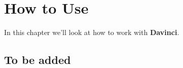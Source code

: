 \chapter{How to Use}

In this chapter we'll look at how to work with \textbf{Davinci}.

\section{To be added}
